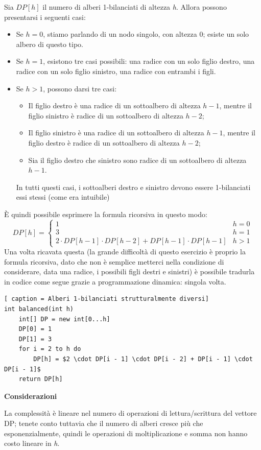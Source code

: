 \documentclass[../cheatSheetAlgoritmi.tex]{subfiles}
\begin{document}
Sia $DP[h]$ il numero di alberi 1-bilanciati di altezza \emph{h}. Allora possono presentarsi i seguenti casi:
\begin{itemize}
	\item Se $h = 0$, stiamo parlando di un nodo singolo, con altezza 0; esiste un solo albero di questo tipo.
	\item Se $h = 1$, esistono tre casi possibili: una radice con un solo figlio destro, una radice con un solo figlio sinistro, una radice con entrambi i figli.
	\item Se $h > 1$, possono darsi tre casi: 
		\begin{itemize}
			\item Il figlio destro è una radice di un sottoalbero di altezza $h - 1$, mentre il figlio sinistro è radice di un sottoalbero di altezza $h - 2$;
			\item Il figlio sinistro è una radice di un sottoalbero di altezza $h - 1$, mentre il figlio destro è radice di un sottoalbero di altezza $h - 2$;
			\item Sia il figlio destro che sinistro sono radice di un sottoalbero di altezza $h - 1$.
		\end{itemize}
		In tutti questi casi, i sottoalberi destro e sinistro devono essere 1-bilanciati essi stessi (come era intuibile)
\end{itemize}
È quindi possibile esprimere la formula ricorsiva in questo modo: 
\begin{equation*}
  	DP[h] =\begin{cases}
    	1 & \text{$h = 0$}\\
    	3 & \text{$h = 1$}\\
    	2 \cdot DP[h - 1] \cdot DP[h - 2]  + DP[h - 1] \cdot DP[h - 1] & \text{$h > 1$}
  	\end{cases}
\end{equation*}
Una volta ricavata questa (la grande difficoltà di questo esercizio è proprio la formula ricorsiva, dato che non è semplice metterci nella condizione di considerare, data una radice, i possibili figli destri e sinistri) è possibile tradurla in codice come segue grazie a programmazione dinamica:
singola volta.
\begin{lstlisting}[ caption = Alberi 1-bilanciati strutturalmente diversi]
int balanced(int h)
	int[] DP = new int[0...h]
	DP[0] = 1
	DP[1] = 3
	for i = 2 to h do
		DP[h] = $2 \cdot DP[i - 1] \cdot DP[i - 2] + DP[i - 1] \cdot DP[i - 1]$
	return DP[h]
\end{lstlisting}
\textbf{Considerazioni} 

La complessità è lineare nel numero di operazioni di lettura/scrittura del vettore DP; tenete conto tuttavia che il numero di alberi cresce più che esponenzialmente, quindi le operazioni di moltiplicazione e somma non hanno costo lineare in \emph{h}.
 
\end{document}
